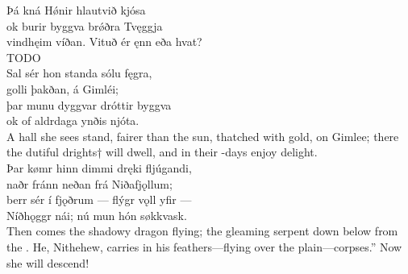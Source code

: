 \bva Þá kná Hǿnir \hld hlautvið kjósa \\%
ok burir byggva \hld brǿðra Tvęggja \\%
vindhęim víðan. \hld Vituð ér ęnn eða hvat?\\%

\bvb TODO\\%

\bva Sal sér hon standa \hld sólu fęgra, \\%
golli þakðan, \hld á Gimléi; \\%
þar munu dyggvar \hld dróttir byggva \\%
ok of aldrdaga \hld ynðis njóta.\\%

\bvb A hall she sees stand, fairer than the sun, thatched with gold, on Gimlee; there the dutiful drights† will dwell, and in their -days enjoy delight.\\%

\bva Þar kømr hinn dimmi \hld dręki fljúgandi, \\%
naðr fránn neðan \hld frá Niðafjǫllum; \\%
berr sér í fjǫðrum \hld — flýgr vǫll yfir — \\%
Níðhǫggr nái; \hld nú mun hón søkkvask.\\%

\bvb Then comes the shadowy dragon flying; the gleaming serpent down below from the . He, Nithehew, carries in his feathers—flying over the plain—corpses.” Now she will descend!\footnotemark[1]\\%
